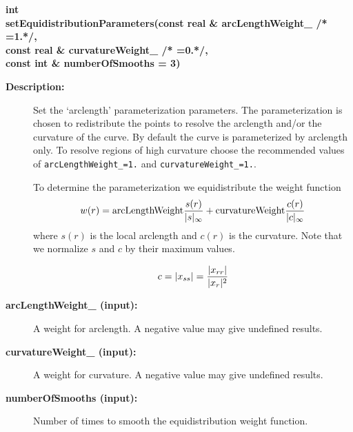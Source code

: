 \begin{flushleft} \textbf{%
int  \\ 
\settowidth{\ReparameterizationTransformIncludeArgIndent}{setEquidistributionParameters(}%
setEquidistributionParameters(const real \& arcLengthWeight\_ /* =1.*/, \\ 
\hspace{\ReparameterizationTransformIncludeArgIndent}const real \& curvatureWeight\_ /* =0.*/,\\ 
\hspace{\ReparameterizationTransformIncludeArgIndent}const int \& numberOfSmooths  = 3)
}\end{flushleft}
\begin{description}
\item[{\bf Description:}] 
   Set the `arclength' parameterization parameters. The parameterization is chosen to
 redistribute the points to resolve the arclength and/or the curvature of the curve.
 By default the curve is parameterized by arclength only. To resolve regions of high
 curvature choose the recommended values of {\tt arcLengthWeight\_=1.} and
  {\tt curvatureWeight\_=1.}.

  To determine the parameterization we equidistribute the weight function 
  \[
     w(r) =      {\rm arcLengthWeight} {s(r)\over |s|_\infty}  
               + {\rm curvatureWeight} {c(r)\over |c|_\infty}
  \]
  where $s(r)$ is the local arclength and $c(r)$ is the curvature. Note that we normalize
 $s$ and $c$ by their maximum values.
  
 \[
      c = |x_{ss}| = { | x_{rr} | \over  |x_r|^2 }
 \]
 
\item[{\bf arcLengthWeight\_ (input):}]  A weight for arclength. A negative value may give undefined results.
\item[{\bf curvatureWeight\_ (input):}]  A weight for curvature. A negative value may give undefined results.
\item[{\bf numberOfSmooths (input):}]  Number of times to smooth the equidistribution weight function.

\end{description}
